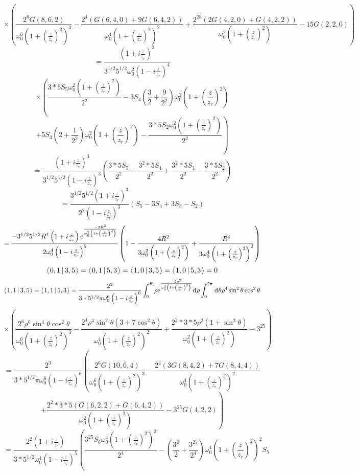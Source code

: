\documentclass[11pt]{amsart}
\makeatletter
\newcommand{\e}{{\rm e}}				%
\newcommand{\msp}[1]{\mspace{#1mu}}		%
\newcommand{\0}{\varnothing}		%
\newcommand{\dd}{\msp{1} {\rm{d}} \msp{1}}	%
\newcommand{\brac}[2]{\left\langle\msp{2} #1\left\lvert \msp{3.5} #2 \right.\right\rangle}	%
\newcommand{\1}{!}
\newcommand{\2}{@}
\newcommand{\3}{\#}
\newcommand{\4}{\$}
\newcommand{\5}{\%}
\newcommand{\6}{$^\wedge$}
\newcommand{\7}{\&}
\newcommand{\8}{*}
\newcommand{\9}{(}
\makeatother
\begin{document}
\[
\times\left(\frac{2^6G(8,6,2)}{\omega_0^6\left(1+\left(\frac{z}{z_r}\right)^2\right)^3}-\frac{2^4\left(G(6,4,0)+9G(6,4,2)\right)}{\omega_0^4\left(1+\left(\frac{z}{z_r}\right)^2\right)^2}+\frac{2^25\left(2G(4,2,0)+G(4,2,2)\right)}{\omega_0^2\left(1+\left(\frac{z}{z_r}\right)^2\right)}-15G(2,2,0)\right)
\]
\[
=\frac{\left(1+i\frac{z}{z_r}\right)^2}{3^{1/2}5^{1/2}\omega_0^2\left(1-i\frac{z}{z_r}\right)^4}
\]
\[
\times\left(\frac{3*5S_5\omega_0^2\left(1+\left(\frac{z}{z_r}\right)^2\right)}{2^2}-3S_4\left(\frac{3}{2}+\frac{9}{2^2}\right)\omega_0^2\left(1+\left(\frac{z}{z_r}\right)^2\right)\right.
\]
\[
\left.+5S_3\left(2+\frac{1}{2^2}\right)\omega_0^2\left(1+\left(\frac{z}{z_r}\right)^2\right)-\frac{3*5S_2\omega_0^2\left(1+\left(\frac{z}{z_r}\right)^2\right)}{2^2}\right)
\]
\[
=\frac{\left(1+i\frac{z}{z_r}\right)^3}{3^{1/2}5^{1/2}\left(1-i\frac{z}{z_r}\right)^3}\left(\frac{3*5S_5}{2^2}-\frac{3^2*5S_4}{2^2}+\frac{3^2*5S_3}{2^2}-\frac{3*5S_2}{2^2}\right)
\]
\[
=\frac{3^{1/2}5^{1/2}\left(1+i\frac{z}{z_r}\right)^3}{2^2\left(1-i\frac{z}{z_r}\right)^3}\left(S_5-3S_4+3S_3-S_2\right)
\]
\[
=\frac{-3^{1/2}5^{1/2}R^4\left(1+i\frac{z}{z_r}\right)\e^{\frac{-2R^2}{\omega_0^2\left(1+\left(\frac{z}{z_r}\right)^2\right)}}}{2\omega_0^4\left(1-i\frac{z}{z_r}\right)^5}\left(1-\frac{4R^2}{3\omega_0^2\left(1+\left(\frac{z}{z_r}\right)^2\right)}+\frac{R^4}{3\omega_0^4\left(1+\left(\frac{z}{z_r}\right)^2\right)^2}\right)
\]
\[
\brac{0,1}{3,5} = \brac{0,1}{5,3} = \brac{1,0}{3,5} = \brac{1,0}{5,3} = 0
\]
\[
\brac{1,1}{3,5} = \brac{1,1}{5,3} = \frac{2^3}{3*5^{1/2}\pi \omega_0^6\left(1-i\frac{z}{z_r}\right)^6}\int_0^R \rho \e^{\frac{-2\rho^2}{\omega_0^2\left(1+\left(\frac{z}{z_r}\right)^2\right)}}\dd \rho\int_0^{2\pi}\dd \theta \rho^4\sin^2\theta\cos^2\theta
\]
\[
\times\left(\frac{2^6\rho^6\sin^4\theta\cos^2\theta}{\omega_0^6\left(1+\left(\frac{z}{z_r}\right)^2\right)^3}-\frac{2^4\rho^4\sin^2\theta\left(3+7\cos^2\theta\right)}{\omega_0^4\left(1+\left(\frac{z}{z_r}\right)^2\right)^2}+\frac{2^2*3*5\rho^2\left(1+\sin^2\theta\right)}{\omega_0^2\left(1+\left(\frac{z}{z_r}\right)^2\right)}-3^25\right)
\]
\[
=\frac{2^3}{3*5^{1/2}\pi \omega_0^6\left(1-i\frac{z}{z_r}\right)^6}\left(\frac{2^6G(10,6,4)}{\omega_0^6\left(1+\left(\frac{z}{z_r}\right)^2\right)^3}-\frac{2^4\left(3G(8,4,2)+7G(8,4,4)\right)}{\omega_0^4\left(1+\left(\frac{z}{z_r}\right)^2\right)^2}
\right.\]
\[
\left.+\frac{2^2*3*5\left(G(6,2,2)+G(6,4,2)\right)}{\omega_0^2\left(1+\left(\frac{z}{z_r}\right)^2\right)}-3^25G(4,2,2)\right)
\]
\[
=\frac{2^2\left(1+i\frac{z}{z_r}\right)}{3*5^{1/2}\omega_0^4\left(1-i\frac{z}{z_r}\right)^5}\left(\frac{3^25S_6\omega_0^4\left(1+\left(\frac{z}{z_r}\right)^2\right)^2}{2^4}-\left(\frac{3^2}{2}+\frac{3^27}{2^4}\right)\omega_0^4\left(1+\left(\frac{z}{z_r}\right)^2\right)^2S_5\right.
\]
\end{document}
